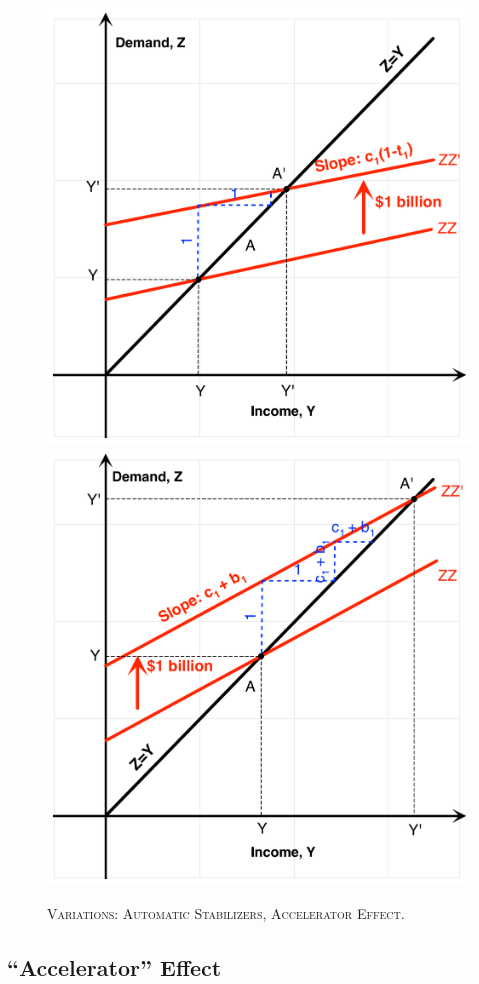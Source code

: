 \documentclass[]{book}
\begin{document}
\begin{figure}

{\centering \includegraphics[width=0.49\linewidth,height=0.49\textheight]{graphsketcher/keynesian-cross-stabilizer} \includegraphics[width=0.49\linewidth,height=0.49\textheight]{graphsketcher/keynesian-cross-accelerator} 

}

\caption{\textsc{Variations: Automatic Stabilizers,
Accelerator Effect}.}\label{fig:keynes-variations}
\end{figure}

\subsection{\texorpdfstring{``Accelerator''
Effect}{Accelerator Effect}}\label{accelerator}
\end{document}

